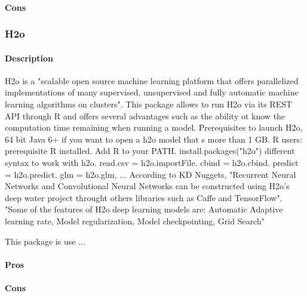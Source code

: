 \documentclass[6pt,letter]{article}\usepackage[]{graphicx}\usepackage[]{color}
\begin{document}
\paragraph{Cons}

\subsubsection{H2o} 
\paragraph{Description}
H2o is a "scalable open source machine learning platform that offers parallelized implementations of many supervised, unsupervised and fully automatic machine learning algorithms on clusters". This package allows to run H2o via its REST API through R and offers several advantages such as the ability ot know the computation time remaining when running a model.
Prerequisites to launch H2o, 64 bit Java 6+ if you want to open a h2o model that s more than 1 GB. 
R users: prerequisite R installed. Add R to your PATH. install.packages("h2o")
different syntax to work with h2o. read.csv = h2o.importFile. cbind = h2o.cbind. predict = h2o.predict. glm = h2o.glm, ...
According to KD Nuggets, "Recurrent Neural Networks and Convolutional Neural Networks can be constructed using H2o's deep water project throught others libraries such as Caffe and TensorFlow". "Some of the features of H2o deep learning models are: Automatic Adaptive learning rate, Model regularization, Model checkpointing, Grid Search"

This package is use ...\cite{h2o2020}

\paragraph{Pros}
\paragraph{Cons}

\end{document}

